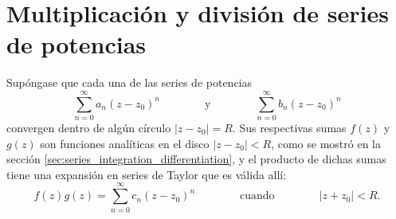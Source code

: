 \documentclass[a4paper]{report}
\begin{document}
\section{Multiplicación y división de series de potencias}

Supóngase que cada una de las series de potencias
\begin{equation}\label{eq:power_series_generic_definition_two}
 \sum_{n=0}^\infty a_n(z-z_0)^n
 \qquad\qquad\textrm{y}\qquad\qquad
 \sum_{n=0}^\infty b_n(z-z_0)^n 
\end{equation}
convergen dentro de algún círculo \(|z-z_0|=R\). Sus respectivas sumas \(f(z)\) y \(g(z)\) son funciones analíticas en el disco \(|z-z_0|<R\), como se mostró en la sección \ref{sec:series_integration_differentiation}, y el producto de dichas sumas tiene una expansión en series de Taylor que es válida allí:
\begin{equation}\label{eq:power_series_product_tmp}
 f(z)g(z)=\sum_{n=0}^\infty c_n(z-z_0)^n
 \qquad\qquad\textrm{cuando}\qquad\qquad
 |z+z_0|<R. 
\end{equation}
\end{document}

